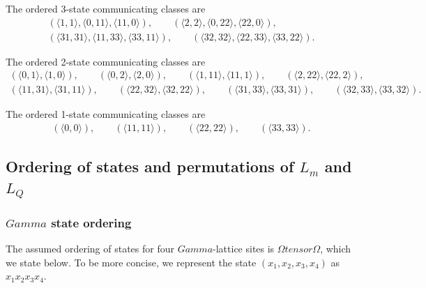 \documentclass[10pt,a4paper]{amsart}
\numberwithin{equation}{section}
\theoremstyle{definition}
\def\boldsymbol#1{#1}
\def\Gamma{Gamma}
\def\otimes{ tensor }
\begin{document}
The ordered 3-state communicating classes are
\begin{gather*}
(\langle 1, 1\rangle, \langle0, 11\rangle, \langle11, 0\rangle),\qquad
(\langle 2, 2\rangle, \langle0, 22\rangle, \langle22, 0\rangle),\\
(\langle 31, 31\rangle, \langle11, 33\rangle, \langle33, 11\rangle),\qquad
(\langle 32, 32\rangle, \langle22, 33\rangle, \langle33, 22\rangle).
\end{gather*}

The ordered 2-state communicating classes are
\begin{gather*}
(\langle 0, 1\rangle, \langle1, 0\rangle),\qquad
(\langle 0, 2\rangle, \langle2, 0\rangle),\qquad
(\langle 1, 11\rangle, \langle11, 1\rangle),\qquad
(\langle 2, 22\rangle, \langle22, 2\rangle),\\
(\langle 11, 31\rangle, \langle31, 11\rangle),\qquad
(\langle 22, 32\rangle, \langle32, 22\rangle),\qquad
(\langle 31, 33\rangle, \langle33, 31\rangle),\qquad
(\langle 32, 33\rangle, \langle33, 32\rangle).
\end{gather*}

The ordered 1-state communicating classes are
\begin{gather*}
(\langle 0, 0\rangle),\qquad
(\langle 11, 11\rangle),\qquad
(\langle 22, 22\rangle),\qquad
(\langle 33, 33\rangle).
\end{gather*}

\subsection[Ordering of states and permutations of L\_m and L\_q]{Ordering of states and permutations of $\boldsymbol{L_m}$ and $\boldsymbol{L_Q}$}
\label{PermutationsAppendix}
\subsubsection[Gamma state ordering]{$\boldsymbol{\Gamma}$ state ordering}
The assumed ordering of states for four $\Gamma$-lattice sites is $\Omega \otimes \Omega$, which we state below. To be more concise, we represent the state $(x_1,x_2,x_3,x_4)$ as $x_1x_2x_3x_4$.
\end{document}
